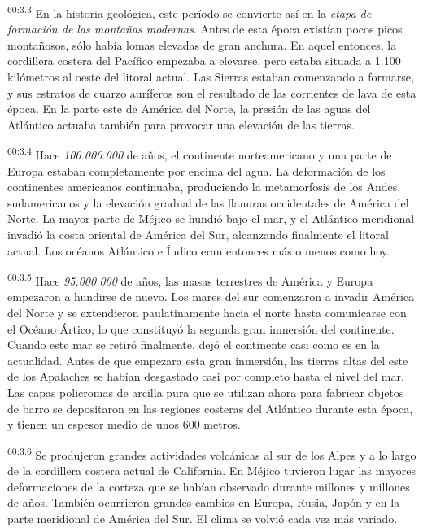 \par
\textsuperscript{60:3.3} En la historia geológica, este período se convierte así en la \textit{etapa de formación de las montañas modernas}. Antes de esta época existían pocos picos montañosos, sólo había lomas elevadas de gran anchura. En aquel entonces, la cordillera costera del Pacífico empezaba a elevarse, pero estaba situada a 1.100 kilómetros al oeste del litoral actual. Las Sierras estaban comenzando a formarse, y sus estratos de cuarzo auríferos son el resultado de las corrientes de lava de esta época. En la parte este de América del Norte, la presión de las aguas del Atlántico actuaba también para provocar una elevación de las tierras.

\par
\textsuperscript{60:3.4} Hace \textit{100.000.000} de años, el continente norteamericano y una parte de Europa estaban completamente por encima del agua. La deformación de los continentes americanos continuaba, produciendo la metamorfosis de los Andes sudamericanos y la elevación gradual de las llanuras occidentales de América del Norte. La mayor parte de Méjico se hundió bajo el mar, y el Atlántico meridional invadió la costa oriental de América del Sur, alcanzando finalmente el litoral actual. Los océanos Atlántico e Índico eran entonces más o menos como hoy.

\par
\textsuperscript{60:3.5} Hace \textit{95.000.000} de años, las masas terrestres de América y Europa empezaron a hundirse de nuevo. Los mares del sur comenzaron a invadir América del Norte y se extendieron paulatinamente hacia el norte hasta comunicarse con el Océano Ártico, lo que constituyó la segunda gran inmersión del continente. Cuando este mar se retiró finalmente, dejó el continente casi como es en la actualidad. Antes de que empezara esta gran inmersión, las tierras altas del este de los Apalaches se habían desgastado casi por completo hasta el nivel del mar. Las capas policromas de arcilla pura que se utilizan ahora para fabricar objetos de barro se depositaron en las regiones costeras del Atlántico durante esta época, y tienen un espesor medio de unos 600 metros.

\par
\textsuperscript{60:3.6} Se produjeron grandes actividades volcánicas al sur de los Alpes y a lo largo de la cordillera costera actual de California. En Méjico tuvieron lugar las mayores deformaciones de la corteza que se habían observado durante millones y millones de años. También ocurrieron grandes cambios en Europa, Rusia, Japón y en la parte meridional de América del Sur. El clima se volvió cada vez más variado.

